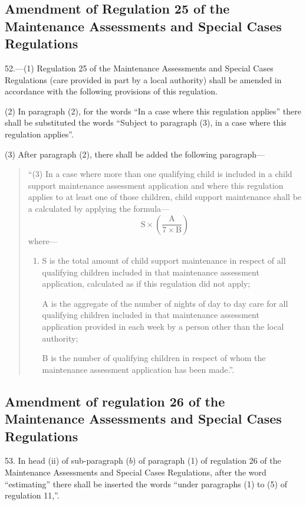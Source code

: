 \documentclass[12pt,a4paper]{article}
\begin{document}
\subsection[52. Amendment of Regulation 25 of the Maintenance Assessments and Special Cases Regulations]{Amendment of Regulation 25 of the Maintenance Assessments and Special Cases Regulations}

52.—(1) Regulation 25 of the Maintenance Assessments and Special Cases Regulations (care provided in part by a local authority) shall be amended in accordance with the following provisions of this regulation.

(2) In paragraph (2), for the words “In a case where this regulation applies” there shall be substituted the words “Subject to paragraph (3), in a case where this regulation applies”.

(3) After paragraph (2), there shall be added the following paragraph—
\begin{quotation}
“(3) In a case where more than one qualifying child is included in a child support maintenance assessment application and where this regulation applies to at least one of those children, child support maintenance shall be a calculated by applying the formula—
\[ \mathrm{S} \times \left( \frac{\mathrm{A}}{7 \times \mathrm{B}} \right)  \]
where—
\begin{enumerate}\item[]
S is the total amount of child support maintenance in respect of all qualifying children included in that maintenance assessment application, calculated as if this regulation did not apply;

A is the aggregate of the number of nights of day to day care for all qualifying children included in that maintenance assessment application provided in each week by a person other than the local authority;

B is the number of qualifying children in respect of whom the maintenance assessment application has been made.”.
\end{enumerate}
\end{quotation}

\subsection[53. Amendment of regulation 26 of the Maintenance Assessments and Special Cases Regulations]{Amendment of regulation 26 of the Maintenance Assessments and Special Cases Regulations}

53.  In head (ii) of sub-paragraph ($b$) of paragraph (1) of regulation 26 of the Maintenance Assessments and Special Cases Regulations, after the word “estimating” there shall be inserted the words “under paragraphs (1) to (5) of regulation 11,”.
\end{document}
